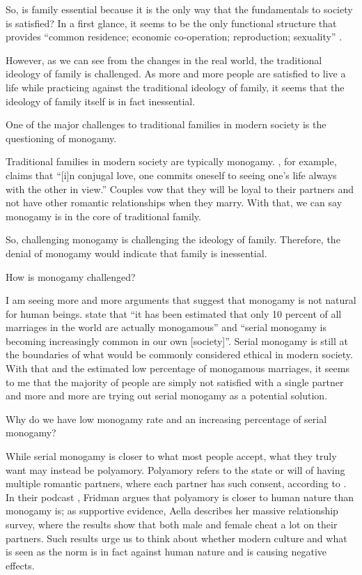 \documentclass[12pt]{article}
\begin{document}
So, is family essential because it is the only way that the fundamentals to
society is satisfied?
In a first glance, it seems to be the only functional structure that provides
``common residence; economic co-operation; reproduction; sexuality''
\citep[p. 60]{gittins1993family}.

However, as we can see from the changes in the real world,
the traditional ideology of family is challenged.
As more and more people are satisfied to live a life while
practicing against the traditional ideology of family,
it seems that the ideology of family itself is in fact inessential.

One of the major challenges to traditional families
in modern society is the questioning of monogamy.

Traditional families in modern society are typically monogamy.
\citet[pp. 4]{schwitzgebel2008thoughts}, for example, claims that
``[i]n conjugal love,
one commits oneself to seeing one's life always with the other in view.''
Couples vow that they will be loyal to their partners and not have other
romantic relationships when they marry.
With that, we can say monogamy is in the core of traditional family.

So, challenging monogamy is challenging the ideology of family.
Therefore, the denial of monogamy would indicate that family is inessential.

How is monogamy challenged?

I am seeing more and more arguments that suggest that monogamy is not natural
for human beings.
\citet[p. 63]{gittins1993family} state that
``it has been estimated that only 10 percent of all
marriages in the world are actually monogamous'' and
``serial monogamy is becoming increasingly common in our own [society]''.
Serial monogamy is still at the boundaries of what would be commonly considered
ethical in modern society.
With that and the estimated low percentage of monogamous marriages,
it seems to me that the majority of people are simply not satisfied with a
single partner and
more and more are trying out serial monogamy as a potential solution.

Why do we have low monogamy rate and an increasing percentage of serial
monogamy?

While serial monogamy is closer to what most people accept,
what they truly want may instead be polyamory.
Polyamory refers to the state or will of having multiple romantic partners,
where each partner has such consent, according to \cite{wikipedia2023polyamory}.
In their podcast \citep{fridman2023aella},
Fridman argues that polyamory is closer to human nature than monogamy is;
as supportive evidence, Aella describes her massive relationship survey,
where the results show that both male and female cheat a lot on their partners.
Such results urge us to think about whether modern culture and what is seen as
the norm is in fact against human nature and is causing negative effects.
\end{document}
